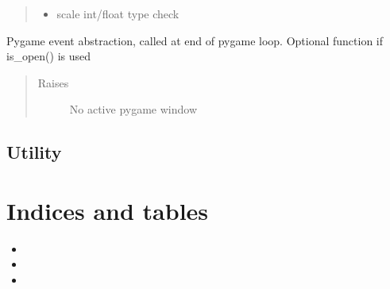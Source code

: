 \documentclass[letterpaper,10pt,english]{sphinxmanual}
\begin{document}
\begin{fulllineitems}
\begin{fulllineitems}
\begin{quote}
\begin{description}
\begin{itemize}
\item {} 
\sphinxAtStartPar
{} \textendash{} scale int/float type check

\end{itemize}

\end{description}\end{quote}

\end{fulllineitems}


\begin{fulllineitems}
\label{\detokenize{window:window.Window.update}}
\pysigstartsignatures
{}
\pysigstopsignatures
\sphinxAtStartPar
Pygame event abstraction, called at end of pygame loop.
Optional function if is\_open() is used
\begin{quote}\begin{description}
\item[{Raises}] \leavevmode
\sphinxAtStartPar
{} \textendash{} No active pygame window

\end{description}\end{quote}

\end{fulllineitems}


\end{fulllineitems}


\sphinxstepscope


\section{Utility}
\label{\detokenize{utility:utility}}\label{\detokenize{utility::doc}}

\chapter{Indices and tables}
\label{\detokenize{index:indices-and-tables}}\begin{itemize}
\item {} 
\sphinxAtStartPar
{}

\item {} 
\sphinxAtStartPar
{}

\item {} 
\sphinxAtStartPar
{}

\end{itemize}



\renewcommand{\indexname}{Index}
\printindex
\end{document}
